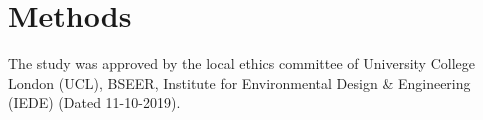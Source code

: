 


\section{Methods}

The study was approved by the local ethics committee of University College London (UCL), BSEER, Institute for Environmental Design \& Engineering (IEDE) (Dated 11-10-2019).

